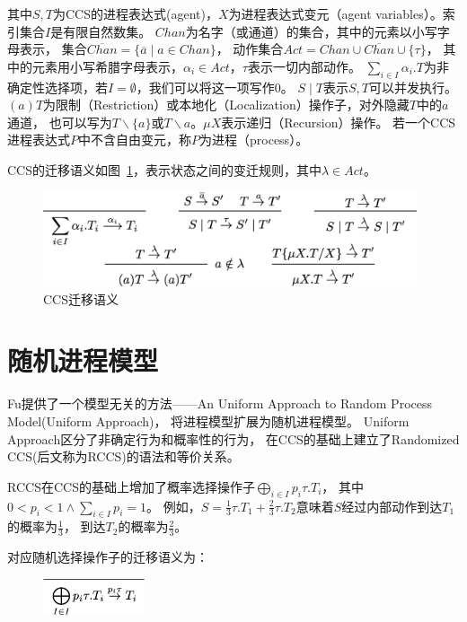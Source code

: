    其中$S,T$为CCS的进程表达式(agent)，$X$为进程表达式变元（agent variables）。索引集合$I$是有限自然数集。
   $Chan$为名字（或通道）的集合，其中的元素以小写字母表示，
   集合$\overline{Chan}=\{\overline{a}\mid a\in Chan\}$，
   动作集合$Act=Chan\cup \overline{Chan}\cup \{\tau\} $，
   其中的元素用小写希腊字母表示，$\alpha_i\in Act$，$\tau$表示一切内部动作。
   $\sum_{i\in I}\alpha_i.T$为非确定性选择项，若$I=\emptyset$，我们可以将这一项写作$0$。
   $S\mid T$表示$S,T$可以并发执行。$(a)T$为限制（Restriction）或本地化（Localization）操作子，对外隐藏$T$中的$a$通道，
   也可以写为$T\backslash \{a\}$或$T\backslash a$。$\mu X$表示递归（Recursion）操作。
   若一个CCS进程表达式$P$中不含自由变元，称$P$为进程（process）。

   CCS的迁移语义如图~\ref{fig_ccs}，表示状态之间的变迁规则，其中$\lambda \in Act$。

   \begin{figure}[!htbp]
    \small
    \centering
    \includegraphics[width=11cm]{../figures/ccs.png}
    \caption[]{CCS迁移语义}
     \label{fig_ccs}
 \end{figure}

   \section{随机进程模型}

   Fu提供了一个模型无关的方法——An Uniform Approach to Random Process Model(Uniform Approach)，
   将进程模型扩展为随机进程模型。
   Uniform Approach区分了非确定行为和概率性的行为，
   在CCS的基础上建立了Randomized CCS(后文称为RCCS)的语法和等价关系。

   RCCS在CCS的基础上增加了概率选择操作子$\bigoplus_{i\in I}p_i\tau.T_i$，
   其中$0<p_i<1 \wedge \sum_{i\in I}p_i = 1$。
   例如，$S=\frac{1}{3}\tau.T_1+\frac{2}{3}\tau.T_2$意味着$S$经过内部动作到达$T_1$的概率为$\frac{1}{3}$，
   到达$T_2$的概率为$\frac{2}{3}$。

   对应随机选择操作子的迁移语义为：
   \begin{figure}[!htbp]
    \small
    \centering
    \includegraphics[width=3cm]{../figures/rccs.png}
     \label{fig_rccs}
 \end{figure}

